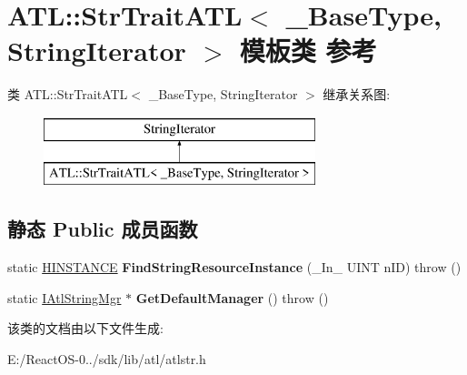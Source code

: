 \hypertarget{class_a_t_l_1_1_str_trait_a_t_l}{}\section{A\+TL\+:\+:Str\+Trait\+A\+TL$<$ \+\_\+\+Base\+Type, String\+Iterator $>$ 模板类 参考}
\label{class_a_t_l_1_1_str_trait_a_t_l}
类 A\+TL\+:\+:Str\+Trait\+A\+TL$<$ \+\_\+\+Base\+Type, String\+Iterator $>$ 继承关系图\+:\begin{figure}[H]
\begin{center}
\leavevmode
\includegraphics[height=2.000000cm]{class_a_t_l_1_1_str_trait_a_t_l}
\end{center}
\end{figure}
\subsection*{静态 Public 成员函数}
\begin{DoxyCompactItemize}
\item 
\mbox{\label{class_a_t_l_1_1_str_trait_a_t_l_a8d7702d6158758fad0cfb2d0bc0a87b1}} 
static \hyperlink{interfacevoid}{H\+I\+N\+S\+T\+A\+N\+CE} {\bfseries Find\+String\+Resource\+Instance} (\+\_\+\+In\+\_\+ U\+I\+NT n\+ID)  throw ()
\item 
\mbox{\label{class_a_t_l_1_1_str_trait_a_t_l_a3ccb500ba519572dd9b4a814de70c90f}} 
static \hyperlink{class_a_t_l_1_1_i_atl_string_mgr}{I\+Atl\+String\+Mgr} $\ast$ {\bfseries Get\+Default\+Manager} ()  throw ()
\end{DoxyCompactItemize}


该类的文档由以下文件生成\+:\begin{DoxyCompactItemize}
\item 
E\+:/\+React\+O\+S-\/0../sdk/lib/atl/atlstr.\+h\end{DoxyCompactItemize}
